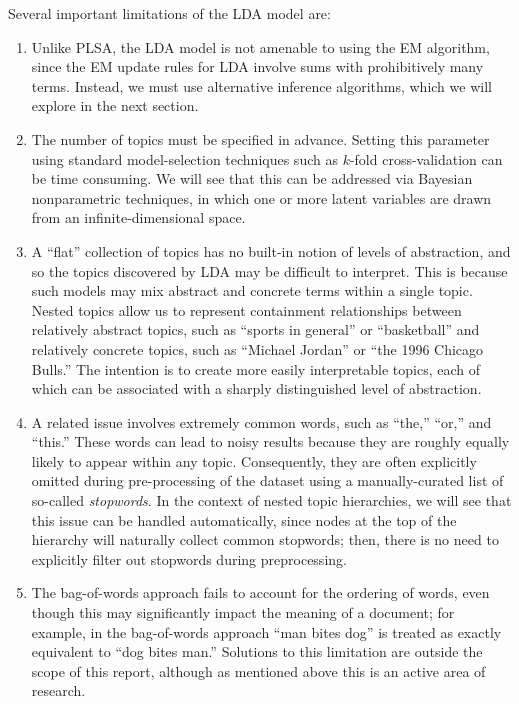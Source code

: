 \documentclass{article}
\begin{document}
Several important limitations of the LDA model are:
\begin{enumerate}
\item Unlike PLSA, the LDA model is not amenable to using the EM algorithm, since the EM update rules for LDA involve sums with prohibitively many terms.
Instead, we must use alternative inference algorithms, which we will explore in the next section.
\item The number of topics must be specified in advance.
Setting this parameter using standard model-selection techniques such as $k$-fold cross-validation can be time consuming.
We will see that this can be addressed via Bayesian nonparametric techniques, in which one or more latent variables are drawn from an infinite-dimensional space.
\item A ``flat'' collection of topics has no built-in notion of levels of abstraction, and so the topics discovered by LDA may be difficult to interpret.
This is because such models may mix abstract and concrete terms within a single topic.
Nested topics allow us to represent containment relationships between relatively abstract topics, such as ``sports in general'' or ``basketball'' and relatively concrete topics, such as ``Michael Jordan'' or ``the 1996 Chicago Bulls.''
The intention is to create more easily interpretable topics, each of which can be associated with a sharply distinguished level of abstraction.
\item A related issue involves extremely common words, such as ``the,'' ``or,'' and ``this.''
These words can lead to noisy results because they are roughly equally likely to appear within any topic.
Consequently, they are often explicitly omitted during pre-processing of the dataset using a manually-curated list of so-called \emph{stopwords}.
In the context of nested topic hierarchies, we will see that this issue can be handled automatically, since nodes at the top of the hierarchy will naturally collect common stopwords; then, there is no need to explicitly filter out stopwords during preprocessing.
\item The bag-of-words approach fails to account for the ordering of words, even though this may significantly impact the meaning of a document; for example, in the bag-of-words approach ``man bites dog'' is treated as exactly equivalent to ``dog bites man.''
Solutions to this limitation are outside the scope of this report, although as mentioned above this is an active area of research.
\end{enumerate}
\end{document}
